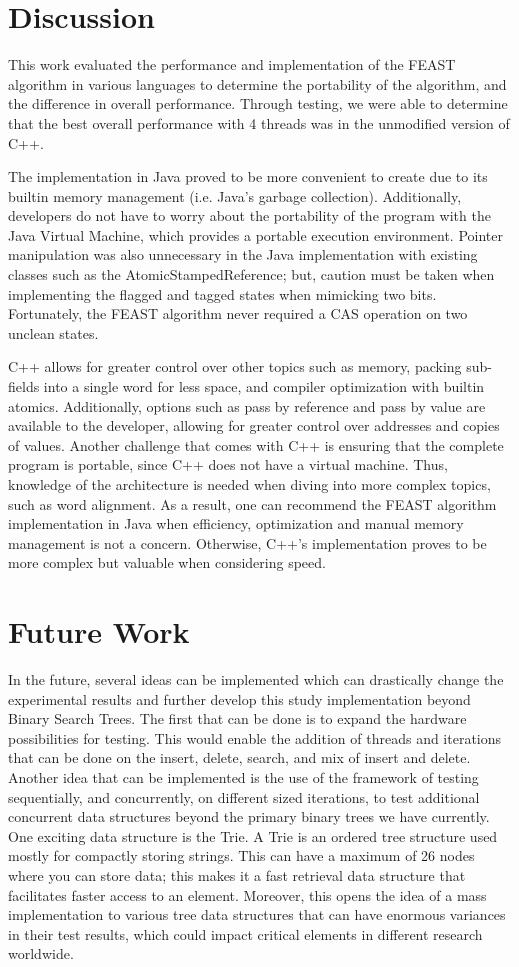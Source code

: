 \documentclass[conference]{IEEEtran}
\begin{document}
\section{Discussion}
This work evaluated the performance and implementation of the FEAST algorithm in various languages to determine the portability of the algorithm, and the difference in overall performance. Through testing, we were able to determine that the best overall performance with 4 threads was in the unmodified version of C++. 

The implementation in Java proved to be more convenient to create due to its builtin memory management (i.e. Java's garbage collection). Additionally, developers do not have to worry about the portability of the program with the Java Virtual Machine, which provides a portable execution environment. Pointer manipulation was also unnecessary in the Java implementation with existing classes such as the AtomicStampedReference; but, caution must be taken when implementing the flagged and tagged states when mimicking two bits. Fortunately, the FEAST algorithm never required a CAS operation on two unclean states. 

C++ allows for greater control over other topics such as memory, packing sub-fields into a single word for less space, and compiler optimization with builtin atomics. Additionally, options such as pass by reference and pass by value are available to the developer, allowing for greater control over addresses and copies of values. Another challenge that comes with C++ is ensuring that the complete program is portable, since C++ does not have a virtual machine. Thus, knowledge of the architecture is needed when diving into more complex topics, such as word alignment. As a result, one can recommend the FEAST algorithm implementation in Java when efficiency, optimization and manual memory management is not a concern. Otherwise, C++'s implementation proves to be more complex but valuable when considering speed.

\section{Future Work}
In the future, several ideas can be implemented which can drastically change the experimental results and further develop this study implementation beyond Binary Search Trees. The first that can be done is to expand the hardware possibilities for testing. This would enable the addition of threads and iterations that can be done on the insert, delete, search, and mix of insert and delete. Another idea that can be implemented is the use of the framework of testing sequentially, and concurrently, on different sized iterations, to test additional concurrent data structures beyond the primary binary trees we have currently. One exciting data structure is the Trie. A Trie is an ordered tree structure used mostly for compactly storing strings. This can have a maximum of 26 nodes where you can store data; this makes it a fast retrieval data structure that facilitates faster access to an element. Moreover, this opens the idea of a mass implementation to various tree data structures that can have enormous variances in their test results, which could impact critical elements in different research worldwide.
\end{document}
